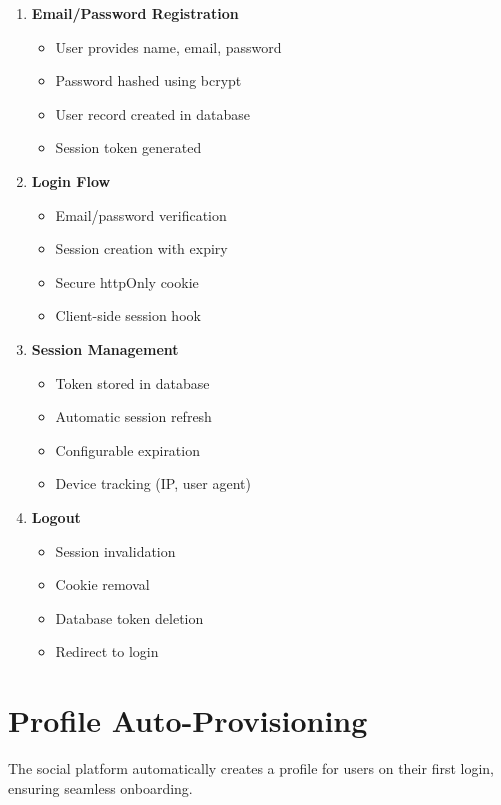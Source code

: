 \documentclass[12pt,a4paper]{report}
\begin{document}
\begin{enumerate}
    \item \textbf{Email/Password Registration}
    \begin{itemize}
        \item User provides name, email, password
        \item Password hashed using bcrypt
        \item User record created in database
        \item Session token generated
    \end{itemize}
    
    \item \textbf{Login Flow}
    \begin{itemize}
        \item Email/password verification
        \item Session creation with expiry
        \item Secure httpOnly cookie
        \item Client-side session hook
    \end{itemize}
    
    \item \textbf{Session Management}
    \begin{itemize}
        \item Token stored in database
        \item Automatic session refresh
        \item Configurable expiration
        \item Device tracking (IP, user agent)
    \end{itemize}
    
    \item \textbf{Logout}
    \begin{itemize}
        \item Session invalidation
        \item Cookie removal
        \item Database token deletion
        \item Redirect to login
    \end{itemize}
\end{enumerate}

\section{Profile Auto-Provisioning}

The social platform automatically creates a profile for users on their first login, ensuring seamless onboarding.
\end{document}
